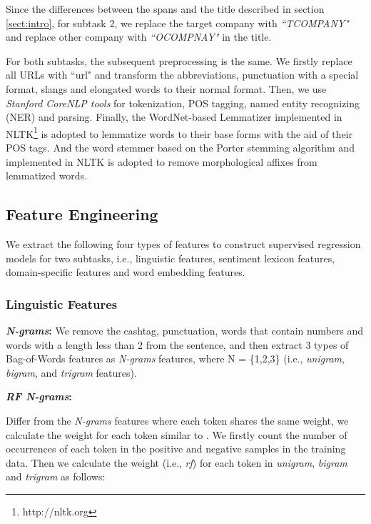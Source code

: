 \documentclass[11pt,a4paper]{article}
\begin{document}
Since the differences between the spans and the title described in section \ref{sect:intro}, for subtask 2, we replace the target company with \emph{``TCOMPANY"} and replace other company with \emph{``OCOMPNAY"} in the title.


For both subtasks, the subsequent preprocessing is the same. We firstly replace all URLs with ``url" and transform the abbreviations, punctuation with a special format, slangs and elongated words to their normal format. Then, we use \emph{Stanford CoreNLP tools}\cite{manning-EtAl:2014:P14-5} for tokenization, POS tagging, named entity recognizing (NER) and parsing. Finally, the WordNet-based Lemmatizer implemented in NLTK\footnote{http://nltk.org} is adopted to lemmatize words to their base forms with the aid of their POS tags. And the word stemmer based on the Porter stemming algorithm and implemented in NLTK is adopted to remove morphological affixes from lemmatized words.




\subsection{Feature Engineering}


We extract the following four types of features to construct supervised regression models for two subtasks, i.e., linguistic features, sentiment lexicon features, domain-specific features and word embedding features.



\subsubsection{Linguistic Features}


\textbf{\emph{N-grams}:}
We remove the cashtag, punctuation, words that contain numbers and words with a length less than 2 from the sentence, and then extract 3 types of Bag-of-Words features as \emph{N-grams} features, where N = \{1,2,3\} (i.e., \emph{unigram}, \emph{bigram}, and \emph{trigram} features).



\textbf{\emph{RF N-grams}:}

Differ from the \emph{N-grams} features where each token shares the same weight, we calculate the weight for each token similar to \cite{lan2009supervised}.  We firstly count the number of occurrences of each token in the positive and negative samples in the training data. Then we calculate the weight (i.e., \emph{rf}) for each token in \emph{unigram}, \emph{bigram} and \emph{trigram} as follows:
\end{document}
